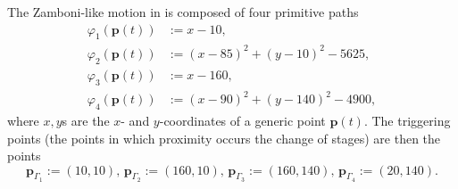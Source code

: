 The Zamboni-like motion in  is composed of four primitive paths
\begin{subequations}\label{eq:basic-plan}\begin{align}
\varphi_1(\mathbf{p}(t))&:=x-10,\label{eq:line1}\\
\varphi_2(\mathbf{p}(t))&:=(x-85)^2+(y-10)^2-5625,\label{eq:circ1}\\
\varphi_3(\mathbf{p}(t))&:=x-160,\label{eq:line2}\\
\varphi_4(\mathbf{p}(t))&:=(x-90)^2+(y-140)^2-4900,\label{eq:circ2}\end{align}
\end{subequations}
where $x,y$s are the $x$- and $y$-coordinates of a generic point $\mathbf{p}(t)$. The triggering points (the points in which proximity occurs the change of stages) are then the points
\begin{equation}\label{eq:basic-plan-trigs}
  \mathbf{p}_{\Gamma_1}:=(10,10),\,\mathbf{p}_{\Gamma_2}:=(160,10),\,\mathbf{p}_{\Gamma_3}:=(160,140),\,\mathbf{p}_{\Gamma_4}:=(20,140).
\end{equation}

